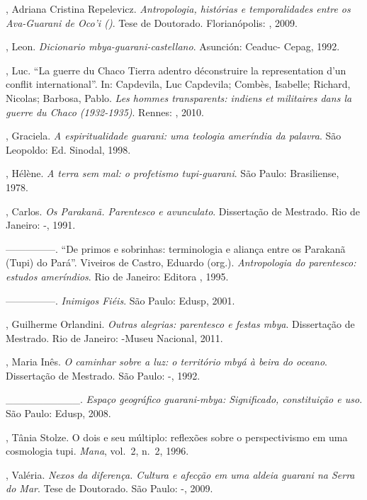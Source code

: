 \begin{Parskip}
, Adriana Cristina Repelevicz. \emph{Antropologia, histórias e
temporalidades entre os Ava-Guarani de Oco’i ()}. Tese de Doutorado.
Florianópolis: , 2009.

, Leon. \emph{Dicionario mbya-guarani-castellano}. Asunción: Ceaduc-
Cepag, 1992.

, Luc. ``La guerre du Chaco Tierra adentro déconstruire la
representation d’un conflit international''. In: Capdevila, Luc
Capdevila; Combès, Isabelle; Richard, Nicolas; Barbosa, Pablo. \emph{Les
hommes transparents: indiens et militaires dans la guerre du Chaco
(1932-1935)}. Rennes: , 2010.

, Graciela. \emph{A espiritualidade guarani: uma teologia ameríndia
da palavra}. São Leopoldo: Ed. Sinodal, 1998.

, Hélène. \emph{A terra sem mal: o profetismo tupi-guarani}. São Paulo:
Brasiliense, 1978.

, Carlos. \emph{Os Parakanã. Parentesco e avunculato}. Dissertação de
Mestrado. Rio de Janeiro: -, 1991.

—————. ``De primos e sobrinhas: terminologia e aliança entre os Parakanã
(Tupi) do Pará''. Viveiros de Castro, Eduardo (org.). \emph{Antropologia do
parentesco: estudos ameríndios}. Rio de Janeiro: Editora , 1995.

—————. \emph{Inimigos Fiéis}. São Paulo: Edusp, 2001.

, Guilherme Orlandini. \emph{Outras alegrias: parentesco e festas mbya}.
 Dissertação de Mestrado. Rio de Janeiro: -Museu Nacional, 2011.

, Maria Inês. \emph{O caminhar sobre a luz: o território mbyá à beira
do oceano}. Dissertação de Mestrado. São Paulo: -, 1992.

\_\_\_\_\_\_\_\_\_\_. \emph{Espaço geográfico guarani-mbya: Significado,
constituição e uso}. São Paulo: Edusp, 2008.

, Tânia Stolze. O dois e seu múltiplo: reflexões sobre o
perspectivismo em uma cosmologia tupi. \emph{Mana}, vol.~2, n.~2, 1996.

, Valéria. \emph{Nexos da diferença. Cultura e afecção em uma aldeia
guarani na Serra do Mar}. Tese de Doutorado. São Paulo: -, 2009.


\end{Parskip}
